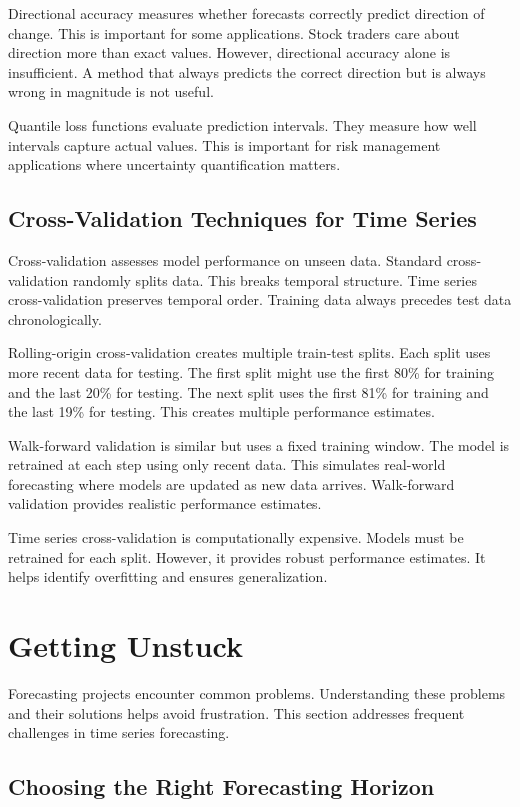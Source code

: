 Directional accuracy measures whether forecasts correctly predict direction of change. This is important for some applications. Stock traders care about direction more than exact values. However, directional accuracy alone is insufficient. A method that always predicts the correct direction but is always wrong in magnitude is not useful.

Quantile loss functions evaluate prediction intervals. They measure how well intervals capture actual values. This is important for risk management applications where uncertainty quantification matters.

\subsection{Cross-Validation Techniques for Time Series}

Cross-validation assesses model performance on unseen data. Standard cross-validation randomly splits data. This breaks temporal structure. Time series cross-validation preserves temporal order. Training data always precedes test data chronologically.

Rolling-origin cross-validation creates multiple train-test splits. Each split uses more recent data for testing. The first split might use the first 80\% for training and the last 20\% for testing. The next split uses the first 81\% for training and the last 19\% for testing. This creates multiple performance estimates.

Walk-forward validation is similar but uses a fixed training window. The model is retrained at each step using only recent data. This simulates real-world forecasting where models are updated as new data arrives. Walk-forward validation provides realistic performance estimates.

Time series cross-validation is computationally expensive. Models must be retrained for each split. However, it provides robust performance estimates. It helps identify overfitting and ensures generalization.

\section{Getting Unstuck}

Forecasting projects encounter common problems. Understanding these problems and their solutions helps avoid frustration. This section addresses frequent challenges in time series forecasting.

\subsection{Choosing the Right Forecasting Horizon}

